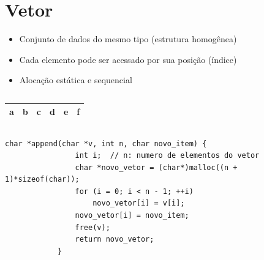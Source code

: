 
\section{Vetor}
\begin{frame}[label=notas]
	\begin{itemize}
		\item Conjunto de dados do mesmo tipo (estrutura homogênea)
		\item Cada elemento pode ser acessado por sua posição (índice)
		\item Alocação estática e sequencial
	\end{itemize}
	\vfill
	\begin{columns}
			\begin{tabular}{*{6}{|c}|}
				\hline a & b & c & d & e & f \\\hline
			\end{tabular}
	\end{columns}
\end{frame}

\begin{frame}[fragile,label=notas]
	\begin{center}
		\begin{minipage}{.8\textwidth}
		\begin{lstlisting}[title=Inserção no fim,morekeywords={append}]
			char *append(char *v, int n, char novo_item) {
			    int i;  // n: numero de elementos do vetor
			    char *novo_vetor = (char*)malloc((n + 1)*sizeof(char));
			    for (i = 0; i < n - 1; ++i)
			        novo_vetor[i] = v[i];
			    novo_vetor[i] = novo_item;  
			    free(v);
			    return novo_vetor;
			}
		\end{lstlisting}
		\end{minipage}
	\end{center}
\end{frame}

